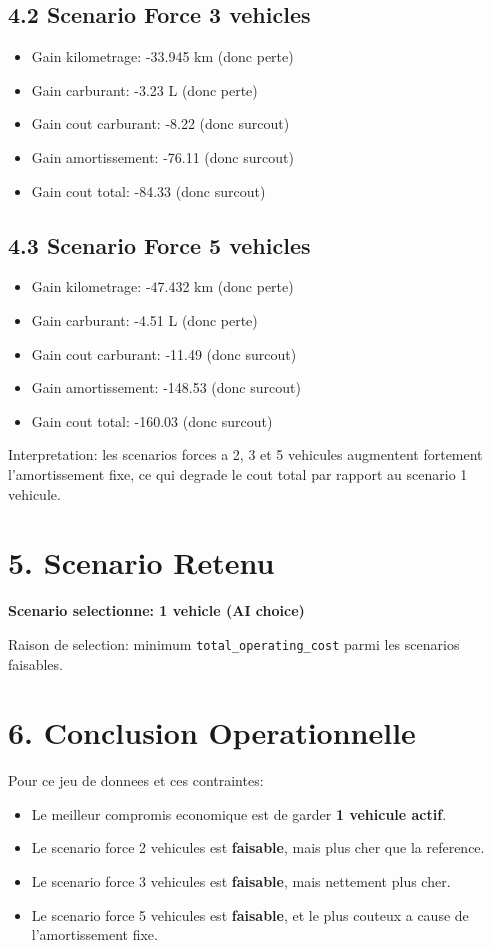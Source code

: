 \documentclass[12pt,a4paper]{article}
\begin{document}
\subsection*{4.2 Scenario Force 3 vehicles}
\begin{itemize}
    \item Gain kilometrage: -33.945 km (donc perte)
    \item Gain carburant: -3.23 L (donc perte)
    \item Gain cout carburant: -8.22 (donc surcout)
    \item Gain amortissement: -76.11 (donc surcout)
    \item Gain cout total: -84.33 (donc surcout)
\end{itemize}

\subsection*{4.3 Scenario Force 5 vehicles}
\begin{itemize}
    \item Gain kilometrage: -47.432 km (donc perte)
    \item Gain carburant: -4.51 L (donc perte)
    \item Gain cout carburant: -11.49 (donc surcout)
    \item Gain amortissement: -148.53 (donc surcout)
    \item Gain cout total: -160.03 (donc surcout)
\end{itemize}

Interpretation: les scenarios forces a 2, 3 et 5 vehicules augmentent fortement l'amortissement fixe, ce qui degrade le cout total par rapport au scenario 1 vehicule.

\section*{5. Scenario Retenu}
\textbf{Scenario selectionne: 1 vehicle (AI choice)}

Raison de selection: minimum \texttt{total\_operating\_cost} parmi les scenarios faisables.

\section*{6. Conclusion Operationnelle}
Pour ce jeu de donnees et ces contraintes:
\begin{itemize}
    \item Le meilleur compromis economique est de garder \textbf{1 vehicule actif}.
    \item Le scenario force 2 vehicules est \textbf{faisable}, mais plus cher que la reference.
    \item Le scenario force 3 vehicules est \textbf{faisable}, mais nettement plus cher.
    \item Le scenario force 5 vehicules est \textbf{faisable}, et le plus couteux a cause de l'amortissement fixe.
\end{itemize}
\end{document}
